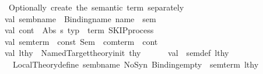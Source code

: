 \begin{isabellebody}
\isanewline
\ \ \ \ \ \ {\isacharparenleft}{\kern0pt}{\isacharasterisk}{\kern0pt}\ Optionally{\isacharcomma}{\kern0pt}\ create\ the\ semantic\ term\ separately\ {\isacharasterisk}{\kern0pt}{\isacharparenright}{\kern0pt}\isanewline
\ \ \ \ \ \ val\ sem{\isacharunderscore}{\kern0pt}bname\ {\isacharequal}{\kern0pt}\ Binding{\isachardot}{\kern0pt}name\ {\isacharparenleft}{\kern0pt}name\ {\isacharcircum}{\kern0pt}\ {\isachardoublequote}{\kern0pt}{\isacharunderscore}{\kern0pt}sem{\isachardoublequote}{\kern0pt}{\isacharparenright}{\kern0pt}\isanewline
\ \ \ \ \ \ val\ cont\ {\isacharequal}{\kern0pt}\ Abs\ {\isacharparenleft}{\kern0pt}{\isachardoublequote}{\kern0pt}s{\isachardoublequote}{\kern0pt}{\isacharcomma}{\kern0pt}\ {\isacharat}{\kern0pt}{\isacharbraceleft}{\kern0pt}typ\ {\isasymsigma}{\isacharbraceright}{\kern0pt}{\isacharcomma}{\kern0pt}\ {\isacharat}{\kern0pt}{\isacharbraceleft}{\kern0pt}term\ {\isachardoublequote}{\kern0pt}SKIP{\isacharunderscore}{\kern0pt}process{\isachardoublequote}{\kern0pt}{\isacharbraceright}{\kern0pt}{\isacharparenright}{\kern0pt}\isanewline
\ \ \ \ \ \ val\ sem{\isacharunderscore}{\kern0pt}term\ {\isacharequal}{\kern0pt}\ {\isacharat}{\kern0pt}{\isacharbraceleft}{\kern0pt}const\ Sem\ {\isachardollar}{\kern0pt}\ com{\isacharunderscore}{\kern0pt}term\ {\isachardollar}{\kern0pt}\ cont\isanewline
\ \ \ \ \ \ \isanewline
\ \ \ \ \ \ val\ lthy{}\ {\isacharequal}{\kern0pt}\ Named{\isacharunderscore}{\kern0pt}Target{\isachardot}{\kern0pt}theory{\isacharunderscore}{\kern0pt}init\ thy{\isacharprime}{\kern0pt}{\isacharprime}{\kern0pt}\isanewline
\ \ \ \ \ \ val\ {\isacharparenleft}{\kern0pt}{\isacharparenleft}{\kern0pt}{\isacharunderscore}{\kern0pt}{\isacharcomma}{\kern0pt}\ sem{\isacharunderscore}{\kern0pt}def{\isacharparenright}{\kern0pt}{\isacharcomma}{\kern0pt}\ lthy{}{\isacharprime}{\kern0pt}{\isacharparenright}{\kern0pt}\ {\isacharequal}{\kern0pt}\isanewline
\ \ \ \ \ \ \ \ Local{\isacharunderscore}{\kern0pt}Theory{\isachardot}{\kern0pt}define\ {\isacharparenleft}{\kern0pt}{\isacharparenleft}{\kern0pt}sem{\isacharunderscore}{\kern0pt}bname{\isacharcomma}{\kern0pt}\ NoSyn{\isacharparenright}{\kern0pt}{\isacharcomma}{\kern0pt}\ {\isacharparenleft}{\kern0pt}{\isacharparenleft}{\kern0pt}Binding{\isachardot}{\kern0pt}empty{\isacharcomma}{\kern0pt}\ {\isacharbrackleft}{\kern0pt}{\isacharbrackright}{\kern0pt}{\isacharparenright}{\kern0pt}{\isacharcomma}{\kern0pt}\ sem{\isacharunderscore}{\kern0pt}term{\isacharparenright}{\kern0pt}{\isacharparenright}{\kern0pt}\ lthy{}\isanewline

\end{isabellebody}
